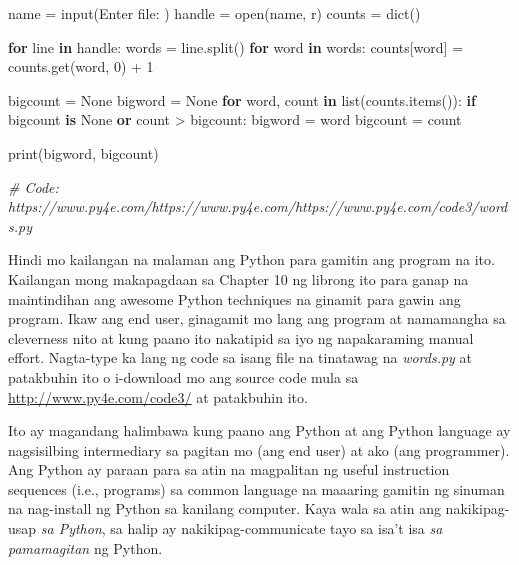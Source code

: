 \documentclass[10pt,]{book}
\newenvironment{Shaded}{}{}
\newcommand{\BuiltInTok}[1]{\textcolor[rgb]{0.00,0.50,0.00}{#1}}
\newcommand{\CommentTok}[1]{\textcolor[rgb]{0.38,0.63,0.69}{\textit{#1}}}
\newcommand{\ControlFlowTok}[1]{\textcolor[rgb]{0.00,0.44,0.13}{\textbf{#1}}}
\newcommand{\DecValTok}[1]{\textcolor[rgb]{0.25,0.63,0.44}{#1}}
\newcommand{\KeywordTok}[1]{\textcolor[rgb]{0.00,0.44,0.13}{\textbf{#1}}}
\newcommand{\NormalTok}[1]{#1}
\newcommand{\OperatorTok}[1]{\textcolor[rgb]{0.40,0.40,0.40}{#1}}
\newcommand{\StringTok}[1]{\textcolor[rgb]{0.25,0.44,0.63}{#1}}
\newcommand{\VariableTok}[1]{\textcolor[rgb]{0.10,0.09,0.49}{#1}}
\begin{document}
\begin{Shaded}
\begin{Highlighting}[]
\NormalTok{name }\OperatorTok{=} \BuiltInTok{input}\NormalTok{(}\StringTok{\textquotesingle{}Enter file: \textquotesingle{}}\NormalTok{)}
\NormalTok{handle }\OperatorTok{=} \BuiltInTok{open}\NormalTok{(name, }\StringTok{\textquotesingle{}r\textquotesingle{}}\NormalTok{)}
\NormalTok{counts }\OperatorTok{=} \BuiltInTok{dict}\NormalTok{()}

\ControlFlowTok{for}\NormalTok{ line }\KeywordTok{in}\NormalTok{ handle:}
\NormalTok{    words }\OperatorTok{=}\NormalTok{ line.split()}
    \ControlFlowTok{for}\NormalTok{ word }\KeywordTok{in}\NormalTok{ words:}
\NormalTok{        counts[word] }\OperatorTok{=}\NormalTok{ counts.get(word, }\DecValTok{0}\NormalTok{) }\OperatorTok{+} \DecValTok{1}

\NormalTok{bigcount }\OperatorTok{=} \VariableTok{None}
\NormalTok{bigword }\OperatorTok{=} \VariableTok{None}
\ControlFlowTok{for}\NormalTok{ word, count }\KeywordTok{in} \BuiltInTok{list}\NormalTok{(counts.items()):}
    \ControlFlowTok{if}\NormalTok{ bigcount }\KeywordTok{is} \VariableTok{None} \KeywordTok{or}\NormalTok{ count }\OperatorTok{\textgreater{}}\NormalTok{ bigcount:}
\NormalTok{        bigword }\OperatorTok{=}\NormalTok{ word}
\NormalTok{        bigcount }\OperatorTok{=}\NormalTok{ count}

\BuiltInTok{print}\NormalTok{(bigword, bigcount)}

\CommentTok{\# Code: https://www.py4e.com/https://www.py4e.com/https://www.py4e.com/code3/words.py}
\end{Highlighting}
\end{Shaded}


Hindi mo kailangan na malaman ang Python para gamitin ang program na
ito. Kailangan mong makapagdaan sa Chapter 10 ng librong ito para ganap
na maintindihan ang awesome Python techniques na ginamit para gawin ang
program. Ikaw ang end user, ginagamit mo lang ang program at namamangha
sa cleverness nito at kung paano ito nakatipid sa iyo ng napakaraming
manual effort. Nagta-type ka lang ng code sa isang file na tinatawag na
\emph{words.py} at patakbuhin ito o i-download mo ang source code mula
sa \url{http://www.py4e.com/code3/} at patakbuhin ito.


Ito ay magandang halimbawa kung paano ang Python at ang Python language
ay nagsisilbing intermediary sa pagitan mo (ang end user) at ako (ang
programmer). Ang Python ay paraan para sa atin na magpalitan ng useful
instruction sequences (i.e., programs) sa common language na maaaring
gamitin ng sinuman na nag-install ng Python sa kanilang computer. Kaya
wala sa atin ang nakikipag-usap \emph{sa Python}, sa halip ay
nakikipag-communicate tayo sa isa't isa \emph{sa pamamagitan} ng Python.
\end{document}
